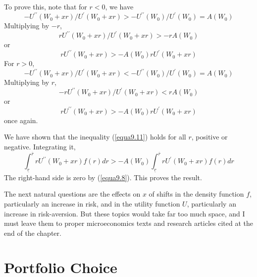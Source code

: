To prove this, note that for $r<0$, we have
\begin{equation*}
 - U^{\prime \prime} (W_0 +xr) / U^\prime (W_0 +xr) > - U^{\prime\prime} (W_0) / U^\prime(W_0) = A(W_0)
\end{equation*}
Multiplying by $-r$,
\begin{equation*}
 r U^{\prime \prime} (W_0 +xr) / U^\prime (W_0 +xr) > -r A(W_0)
\end{equation*}
or 
\begin{equation} \label{equa9.11}
r U^{\prime \prime} (W_0 +xr) > - A(W_0) r  U^\prime (W_0 +xr)
\end{equation}
For $r>0$,
\begin{equation*}
 - U^{\prime \prime} (W_0 +xr) / U^\prime (W_0 +xr) < - U^{\prime\prime} (W_0) / U^\prime(W_0) = A(W_0)
\end{equation*}
Multiplying by $r$,
\begin{equation*}
 -r U^{\prime \prime} (W_0 +xr) / U^\prime (W_0 +xr) < r A(W_0)
\end{equation*}
or 
\begin{equation*}
 r U^{\prime \prime} (W_0 +xr) >  -A(W_0) r U^\prime (W_0 +xr) 
\end{equation*}
once again.

We have shown that the inequality (\ref{equa9.11}) holds for all $r$, positive or negative. Integrating it,
\begin{equation*}
 \int_{\underline{r}}^{\overline{r}} r U^{\prime \prime} (W_0 +xr) f(r)dr > -A(W_0) \int_{\underline{r}}^{\overline{r}} r U^\prime (W_0 +xr) f(r) dr
\end{equation*}
The right-hand side is zero by (\ref{equa9.8}). This proves the result.

The next natural questions are the effects on $x$ of shifts in the density function $f$, particularly an increase in risk, and in the utility function $U$, particularly an increase in risk-aversion. But these topics would take far too much space, and I must leave them to proper microeconomics texts and research articles cited at the end of the chapter.

\section*{Portfolio Choice}

